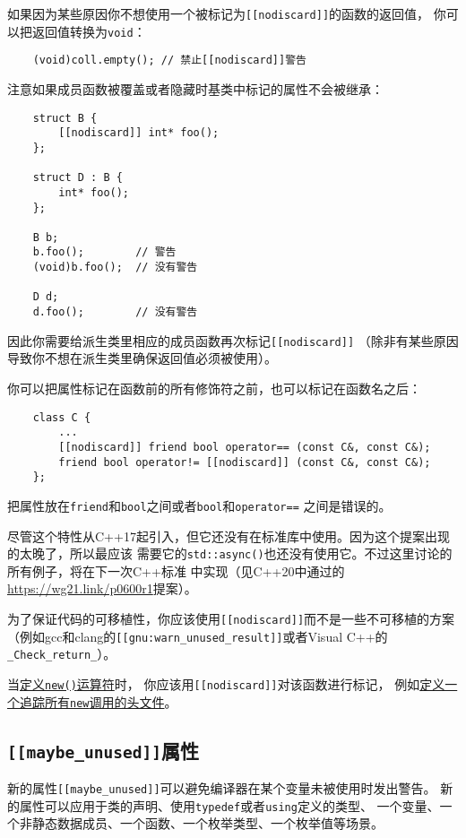 如果因为某些原因你不想使用一个被标记为\texttt{[[nodiscard]]}的函数的返回值，
你可以把返回值转换为\texttt{void}：
\begin{lstlisting}
    (void)coll.empty(); // 禁止[[nodiscard]]警告
\end{lstlisting}
注意如果成员函数被覆盖或者隐藏时基类中标记的属性不会被继承：
\begin{lstlisting}
    struct B {
        [[nodiscard]] int* foo();
    };

    struct D : B {
        int* foo();
    };

    B b;
    b.foo();        // 警告
    (void)b.foo();  // 没有警告

    D d;
    d.foo();        // 没有警告
\end{lstlisting}
因此你需要给派生类里相应的成员函数再次标记\texttt{[[nodiscard]]}
（除非有某些原因导致你不想在派生类里确保返回值必须被使用）。

你可以把属性标记在函数前的所有修饰符之前，也可以标记在函数名之后：
\begin{lstlisting}
    class C {
        ...
        [[nodiscard]] friend bool operator== (const C&, const C&);
        friend bool operator!= [[nodiscard]] (const C&, const C&);
    };
\end{lstlisting}
把属性放在\texttt{friend}和\texttt{bool}之间或者\texttt{bool}和\texttt{operator==}
之间是错误的。

尽管这个特性从C++17起引入，但它还没有在标准库中使用。因为这个提案出现的太晚了，所以最应该
需要它的\texttt{std::async()}也还没有使用它。不过这里讨论的所有例子，将在下一次C++标准
中实现（见C++20中通过的\url{https://wg21.link/p0600r1}提案）。

为了保证代码的可移植性，你应该使用\texttt{[[nodiscard]]}而不是一些不可移植的方案
（例如gcc和clang的\texttt{[[gnu:warn\_unused\_result]]}或者Visual C++的
\texttt{\_Check\_return\_}）。

当\hyperref[ch30.2.2]{定义\texttt{new()}运算符}时，
你应该用\texttt{[[nodiscard]]}对该函数进行标记，
例如\hyperref[ch30.4]{定义一个追踪所有\texttt{new}调用的头文件}。

\subsection{\texttt{[[maybe\_unused]]}属性}
新的属性\texttt{[[maybe\_unused]]}可以避免编译器在某个变量未被使用时发出警告。
新的属性可以应用于类的声明、使用\texttt{typedef}或者\texttt{using}定义的类型、
一个变量、一个非静态数据成员、一个函数、一个枚举类型、一个枚举值等场景。

